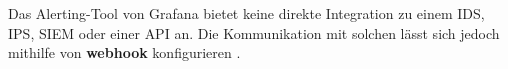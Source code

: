 Das Alerting-Tool von Grafana bietet keine direkte Integration zu einem \gls{IDS}, \gls{IPS}, \gls{SIEM} oder einer \gls{API} an. Die Kommunikation mit solchen  lässt sich jedoch mithilfe von \textbf{\gls{webhook}} konfigurieren \citep{Grafana_Notifications}.

